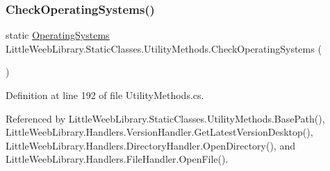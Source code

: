 \subsubsection{\texorpdfstring{Check\+Operating\+Systems()}{CheckOperatingSystems()}}
{\footnotesize\ttfamily static \mbox{\hyperlink{class_little_weeb_library_1_1_static_classes_1_1_utility_methods_aad4a2807f22b8cb65b8db3cdc981a0b1}{Operating\+Systems}} Little\+Weeb\+Library.\+Static\+Classes.\+Utility\+Methods.\+Check\+Operating\+Systems (\begin{DoxyParamCaption}{ }\end{DoxyParamCaption})\hspace{0.3cm}{\ttfamily [static]}}



Definition at line 192 of file Utility\+Methods.\+cs.



Referenced by Little\+Weeb\+Library.\+Static\+Classes.\+Utility\+Methods.\+Base\+Path(), Little\+Weeb\+Library.\+Handlers.\+Version\+Handler.\+Get\+Latest\+Version\+Desktop(), Little\+Weeb\+Library.\+Handlers.\+Directory\+Handler.\+Open\+Directory(), and Little\+Weeb\+Library.\+Handlers.\+File\+Handler.\+Open\+File().


